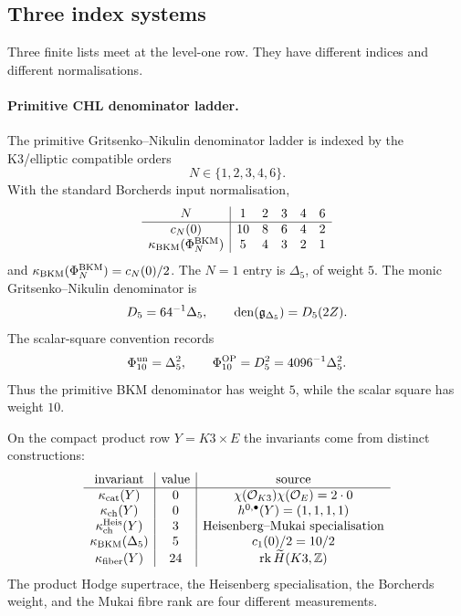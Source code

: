 \subsection*{Three index systems}

Three finite lists meet at the level-one row.  They have different
indices and different normalisations.

\paragraph{Primitive CHL denominator ladder.}
The primitive Gritsenko--Nikulin denominator ladder is indexed by the
K3/elliptic compatible orders
\[
  N\in\{1,2,3,4,6\}.
\]
With the standard Borcherds input normalisation,
\[
\begin{array}{c|ccccc}
N&1&2&3&4&6\\ \hline
c_N(0)&10&8&6&4&2\\
\kappa_{\mathrm{BKM}}(\Phi_N^{\mathrm{BKM}})&5&4&3&2&1
\end{array}
\]
and $\kappa_{\mathrm{BKM}}(\Phi_N^{\mathrm{BKM}})=c_N(0)/2$.  The $N=1$ entry is
$\Delta_5$, of weight $5$.  The monic Gritsenko--Nikulin denominator is
\[
  D_5=64^{-1}\Delta_5,\qquad
  \operatorname{den}(\mathfrak{g}_{\Delta_5})=D_5(2Z).
\]
The scalar-square convention records
\[
  \Phi_{10}^{\mathrm{un}}=\Delta_5^2,\qquad
  \Phi_{10}^{\mathrm{OP}}=D_5^2=4096^{-1}\Delta_5^2 .
\]
Thus the primitive BKM denominator has weight $5$, while the scalar
square has weight $10$.

On the compact product row $Y=K3\times E$ the invariants come from
distinct constructions:
\[
\begin{array}{c|c|c}
\text{invariant}&\text{value}&\text{source}\\ \hline
\kappa_{\mathrm{cat}}(Y)&0&\chi(\mathcal{O}_{K3})\chi(\mathcal{O}_E)=2\cdot0\\
\kappa_{\mathrm{ch}}(Y)&0&h^{0,\bullet}(Y)=(1,1,1,1)\\
\kappa_{\mathrm{ch}}^{\mathrm{Heis}}(Y)&3&\text{Heisenberg--Mukai specialisation}\\
\kappa_{\mathrm{BKM}}(\Delta_5)&5&c_1(0)/2=10/2\\
\kappa_{\mathrm{fiber}}(Y)&24&\operatorname{rk}\widetilde H(K3,\mathbb{Z})
\end{array}
\]
The product Hodge supertrace, the Heisenberg specialisation, the
Borcherds weight, and the Mukai fibre rank are four different
measurements.

